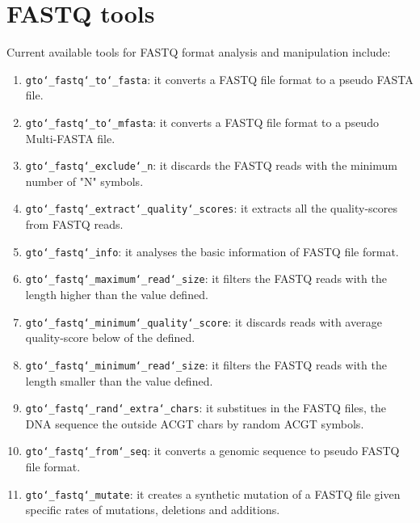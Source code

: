 \chapter{FASTQ tools}
\label{fastq}

Current available tools for FASTQ format analysis and manipulation include:
\begin{enumerate}

\item \texttt{gto\char`_fastq\char`_to\char`_fasta}: it converts a FASTQ file format to a pseudo FASTA file.

\item \texttt{gto\char`_fastq\char`_to\char`_mfasta}: it converts a FASTQ file format to a pseudo Multi-FASTA file.

\item \texttt{gto\char`_fastq\char`_exclude\char`_n}: it discards the FASTQ reads with the minimum number of "N" symbols.

\item \texttt{gto\char`_fastq\char`_extract\char`_quality\char`_scores}: it extracts all the quality-scores from FASTQ reads.

\item \texttt{gto\char`_fastq\char`_info}: it analyses the basic information of FASTQ file format.

\item \texttt{gto\char`_fastq\char`_maximum\char`_read\char`_size}: it filters the FASTQ reads with the length higher than the value defined.

\item \texttt{gto\char`_fastq\char`_minimum\char`_quality\char`_score}: it discards reads with average quality-score below of the defined.

\item \texttt{gto\char`_fastq\char`_minimum\char`_read\char`_size}: it filters the FASTQ reads with the length smaller than the value defined.

\item \texttt{gto\char`_fastq\char`_rand\char`_extra\char`_chars}: it substitues in the FASTQ files, the DNA sequence the outside ACGT chars by random ACGT symbols.

\item \texttt{gto\char`_fastq\char`_from\char`_seq}: it converts a genomic sequence to pseudo FASTQ file format.

\item \texttt{gto\char`_fastq\char`_mutate}: it creates a synthetic mutation of a FASTQ file given specific rates of mutations, deletions and additions.


\end{enumerate}
